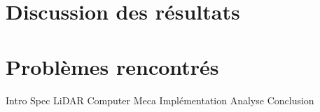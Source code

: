 \section{Discussion des résultats}



\section{Problèmes rencontrés}



Intro 
Spec 
LiDAR 
Computer
Meca 
Implémentation
Analyse
Conclusion